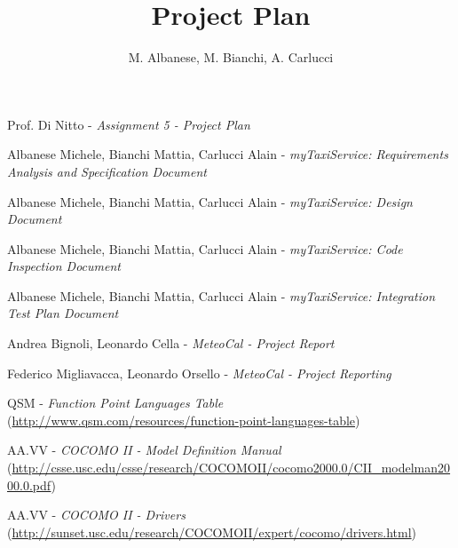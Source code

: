 \documentclass[a4paper, 12pt]{article}
\begin{document}
\title{Project Plan}

\author{M. Albanese, M. Bianchi, A. Carlucci}

\maketitle
\newpage{}
\tableofcontents{}

\newpage{}

\pagestyle{fancy}


\newpage



\newpage



\newpage



\newpage



\appendix

\clearpage
{}

\begin{thebibliography}{9}
    Prof. Di Nitto - \emph{Assignment 5 - Project Plan}

        Albanese Michele, Bianchi Mattia, Carlucci Alain - \emph{myTaxiService: Requirements Analysis and Specification Document}

        Albanese Michele, Bianchi Mattia, Carlucci Alain - \emph{myTaxiService: Design Document}

        Albanese Michele, Bianchi Mattia, Carlucci Alain - \emph{myTaxiService: Code Inspection Document}

        Albanese Michele, Bianchi Mattia, Carlucci Alain - \emph{myTaxiService: Integration Test Plan Document}

        Andrea Bignoli, Leonardo Cella - \emph{MeteoCal - Project Report}

    Federico Migliavacca, Leonardo Orsello - \emph{MeteoCal - Project Reporting}

 QSM - \emph{Function Point Languages Table} \small{(\url{http://www.qsm.com/resources/function-point-languages-table})}

 AA.VV - \emph{COCOMO II - Model Definition Manual} \small{(\url{http://csse.usc.edu/csse/research/COCOMOII/cocomo2000.0/CII_modelman2000.0.pdf})} 

 AA.VV - \emph{COCOMO II - Drivers} \small{(\url{http://sunset.usc.edu/research/COCOMOII/expert/cocomo/drivers.html})} 

\end{thebibliography}

\vfill
\end{document}
